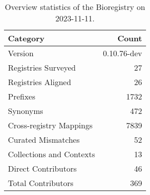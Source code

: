 \begin{table}
\caption{Overview statistics of the Bioregistry on 2023-11-11.}
\label{tab:bioregistry-summary}
\begin{tabular}{lr}
\toprule
Category & Count \\
\midrule
Version & 0.10.76-dev \\
Registries Surveyed & 27 \\
Registries Aligned & 26 \\
Prefixes & 1732 \\
Synonyms & 472 \\
Cross-registry Mappings & 7839 \\
Curated Mismatches & 52 \\
Collections and Contexts & 13 \\
Direct Contributors & 46 \\
Total Contributors & 369 \\
\bottomrule
\end{tabular}
\end{table}
